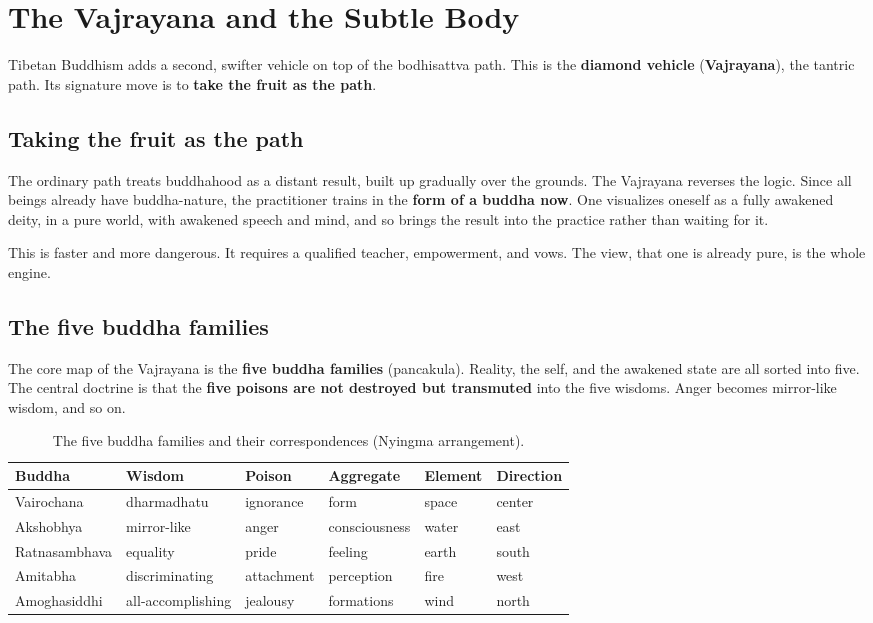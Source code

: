 \section{The Vajrayana and the Subtle Body}

Tibetan Buddhism adds a second, swifter vehicle on top of the bodhisattva path. This is the \textbf{diamond vehicle} (\textbf{Vajrayana}), the tantric path. Its signature move is to \textbf{take the fruit as the path}.

\subsection{Taking the fruit as the path}

The ordinary path treats buddhahood as a distant result, built up gradually over the grounds. The Vajrayana reverses the logic. Since all beings already have buddha-nature, the practitioner trains in the \textbf{form of a buddha now}. One visualizes oneself as a fully awakened deity, in a pure world, with awakened speech and mind, and so brings the result into the practice rather than waiting for it.

This is faster and more dangerous. It requires a qualified teacher, empowerment, and vows. The view, that one is already pure, is the whole engine.

\subsection{The five buddha families}

The core map of the Vajrayana is the \textbf{five buddha families} (pancakula). Reality, the self, and the awakened state are all sorted into five. The central doctrine is that the \textbf{five poisons are not destroyed but transmuted} into the five wisdoms. Anger becomes mirror-like wisdom, and so on.

\begin{longtable}{L{2.6cm} L{2.2cm} L{3.0cm} L{2.4cm} l l}
\caption{The five buddha families and their correspondences (Nyingma arrangement).}\\
\toprule
\textbf{Buddha} & \textbf{Wisdom} & \textbf{Poison} & \textbf{Aggregate} & \textbf{Element} & \textbf{Direction} \\
\midrule
Vairochana & dharmadhatu & ignorance & form & space & center \\
Akshobhya & mirror-like & anger & consciousness & water & east \\
Ratnasambhava & equality & pride & feeling & earth & south \\
Amitabha & discriminating & attachment & perception & fire & west \\
Amoghasiddhi & all-accomplishing & jealousy & formations & wind & north \\
\bottomrule
\end{longtable}

